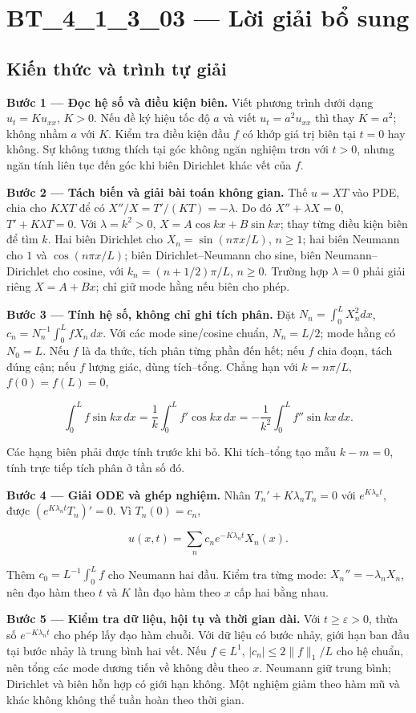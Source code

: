 \documentclass[10pt,a4paper]{article}
\begin{document}
\section*{BT\_4\_1\_3\_03 — Lời giải bổ sung}
\subsection*{Kiến thức và trình tự giải}
\textbf{Bước 1 — Đọc hệ số và điều kiện biên.} Viết phương trình dưới dạng $u_t=Ku_{xx}$, $K>0$. Nếu đề ký hiệu tốc độ $a$ và viết $u_t=a^2u_{xx}$ thì thay $K=a^2$; không nhầm $a$ với $K$. Kiểm tra điều kiện đầu $f$ có khớp giá trị biên tại $t=0$ hay không. Sự không tương thích tại góc không ngăn nghiệm trơn với $t>0$, nhưng ngăn tính liên tục đến góc khi biên Dirichlet khác vết của $f$.

\textbf{Bước 2 — Tách biến và giải bài toán không gian.} Thế $u=XT$ vào PDE, chia cho $KXT$ để có $X''/X=T'/(KT)=-\lambda$. Do đó $X''+\lambda X=0$, $T'+K\lambda T=0$. Với $\lambda=k^2>0$, $X=A\cos kx+B\sin kx$; thay từng điều kiện biên để tìm $k$. Hai biên Dirichlet cho $X_n=\sin(n\pi x/L)$, $n\ge1$; hai biên Neumann cho $1$ và $\cos(n\pi x/L)$; biên Dirichlet–Neumann cho sine, biên Neumann–Dirichlet cho cosine, với $k_n=(n+1/2)\pi/L$, $n\ge0$. Trường hợp $\lambda=0$ phải giải riêng $X=A+Bx$; chỉ giữ mode hằng nếu biên cho phép.

\textbf{Bước 3 — Tính hệ số, không chỉ ghi tích phân.} Đặt $N_n=\int_0^L X_n^2dx$, $c_n=N_n^{-1}\int_0^L fX_n\,dx$. Với các mode sine/cosine chuẩn, $N_n=L/2$; mode hằng có $N_0=L$. Nếu $f$ là đa thức, tích phân từng phần đến hết; nếu $f$ chia đoạn, tách đúng cận; nếu $f$ lượng giác, dùng tích–tổng. Chẳng hạn với $k=n\pi/L$, $f(0)=f(L)=0$,


\[
\int_0^Lf\sin kx\,dx=\frac1k\int_0^Lf'\cos kx\,dx
=-\frac1{k^2}\int_0^Lf''\sin kx\,dx.
\]


Các hạng biên phải được tính trước khi bỏ. Khi tích–tổng tạo mẫu $k-m=0$, tính trực tiếp tích phân ở tần số đó.

\textbf{Bước 4 — Giải ODE và ghép nghiệm.} Nhân $T_n'+K\lambda_nT_n=0$ với $e^{K\lambda_nt}$, được $(e^{K\lambda_nt}T_n)'=0$. Vì $T_n(0)=c_n$,


\[
u(x,t)=\sum_n c_ne^{-K\lambda_nt}X_n(x).
\]


Thêm $c_0=L^{-1}\int_0^Lf$ cho Neumann hai đầu. Kiểm tra từng mode: $X_n''=-\lambda_nX_n$, nên đạo hàm theo $t$ và $K$ lần đạo hàm theo $x$ cấp hai bằng nhau.

\textbf{Bước 5 — Kiểm tra dữ liệu, hội tụ và thời gian dài.} Với $t\ge\varepsilon>0$, thừa số $e^{-K\lambda_nt}$ cho phép lấy đạo hàm chuỗi. Với dữ liệu có bước nhảy, giới hạn ban đầu tại bước nhảy là trung bình hai vết. Nếu $f\in L^1$, $|c_n|\le2\|f\|_1/L$ cho hệ chuẩn, nên tổng các mode dương tiến về không đều theo $x$. Neumann giữ trung bình; Dirichlet và biên hỗn hợp có giới hạn không. Một nghiệm giảm theo hàm mũ và khác không không thể tuần hoàn theo thời gian.
\end{document}
